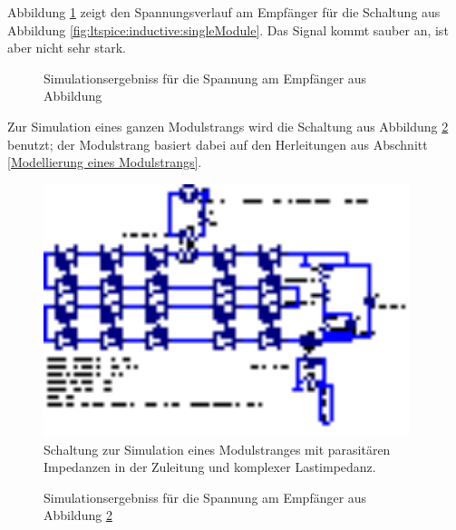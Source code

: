 Abbildung  \ref{fig:simu:inductive:singleModule}  zeigt  den  Spannungsverlauf
am      Empf\"anger      f\"ur      die      Schaltung      aus      Abbildung
\ref{fig:ltspice:inductive:singleModule}. Das Signal kommt sauber an, ist aber
nicht sehr stark.

\begin{figure}[h!tb]
    
    \caption{%
        Simulationsergebniss f\"ur die Spannung am Empf\"anger aus Abbildung
        \label{fig:ltspice:inductive:singleModule}%
    }
    \label{fig:simu:inductive:singleModule}
\end{figure}

Zur  Simulation eines  ganzen Modulstrangs  wird die  Schaltung aus  Abbildung
\ref{fig:ltspice:inductive:complete}  benutzt; der  Modulstrang basiert  dabei
auf den Herleitungen aus Abschnitt \ref{Modellierung eines Modulstrangs}.

\begin{figure}[h!tb]
    \centering
    \includegraphics[width=0.95\textwidth]{images/ltspice/jac/inductive.eps}
    \caption{%
        Schaltung  zur   Simulation  eines  Modulstranges   mit  parasit\"aren
        Impedanzen in der Zuleitung und komplexer Lastimpedanz.%
    }
    \label{fig:ltspice:inductive:complete}
\end{figure}

\begin{figure}[h!tb]
    
    \caption{%
        Simulationsergebniss f\"ur die Spannung am Empf\"anger aus Abbildung
        \ref{fig:ltspice:inductive:complete}%
    }
    \label{fig:simu:inductive:stepping}
\end{figure}


